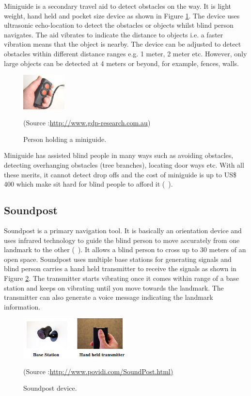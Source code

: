Miniguide is a secondary travel aid 
to detect obstacles on the way. 
It is light weight, hand held and 
pocket size device as shown in Figure \ref{fig:miniguide}.
The device uses ultrasonic echo-location 
to detect the obstacles or objects whilst blind person 
navigates. The aid vibrates to indicate the distance to objects 
i.e. a faster vibration means that the object is nearby. 
The device can be adjusted to detect obstacles within different 
distance ranges e.g. 1 meter, 2 meter etc. However, 
only large objects can be detected at 
4 meters or beyond, for example, fences, walls.


\begin{figure}[h!]
\centering{} \includegraphics[width=0.2\textwidth]{Images/miniguide.jpg}
\caption{\label{fig:miniguide} Person holding a miniguide.}
\small (Source :\url{http://www.gdp-research.com.au})
\end{figure}

Miniguide has assisted blind people in 
many ways such as avoiding obstacles, 
detecting overhanging obstacles 
(tree branches), locating door ways etc. 
With all these merits, it cannot detect drop offs and 
the cost of miniguide is up to US\$ 400 which 
make sit hard for blind people to afford it (~\citet{miniguide}).

\subsection{Soundpost}
\label{sec:soundpost}

Soundpost is a primary navigation tool. It is 
basically an orientation device and uses 
infrared technology to guide the blind person 
to move accurately from one landmark to the 
other (~\citet{povidi}). It allows 
a blind person to cross up to 
30 meters of an open space. Soundpost uses multiple base stations for generating 
signals and blind person carries a hand held transmitter to 
receive the signals as shown in Figure \ref{fig:soundpost}.
The transmitter starts vibrating once it comes within range 
of a base station and keeps on vibrating until 
you move towards the landmark. 
The transmitter can also generate 
a voice message indicating the landmark information. 


\begin{figure}[h!]
\centering{} \includegraphics[width=0.5\textwidth]{Images/soundpost.png}
\caption{\label{fig:soundpost} Soundpost device.}
\small (Source :\url{http://www.povidi.com/SoundPost.html)}
\end{figure}


